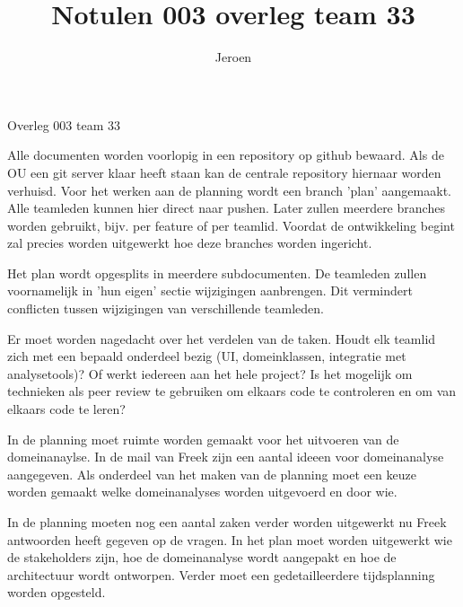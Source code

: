 \documentclass{article}
\title{Notulen 003 overleg team 33}
\author{Jeroen}
\begin{document}

\begin{Minutes}{Overleg 003 team 33}

\maketitle%


Alle documenten worden voorlopig in een repository op github bewaard. Als de OU een git server klaar heeft staan
kan de centrale repository hiernaar worden verhuisd. Voor het werken aan de planning wordt een branch 'plan' aangemaakt.
Alle teamleden kunnen hier direct naar pushen. Later zullen meerdere branches worden gebruikt, bijv. per feature of per
teamlid. Voordat de ontwikkeling begint zal precies worden uitgewerkt hoe deze branches worden ingericht.


Het plan wordt opgesplits in meerdere subdocumenten. De teamleden zullen voornamelijk in 'hun eigen' sectie
wijzigingen aanbrengen. Dit vermindert conflicten tussen wijzigingen van verschillende teamleden.


Er moet worden nagedacht over het verdelen van de taken. Houdt elk teamlid zich met een bepaald onderdeel bezig
(UI, domeinklassen, integratie met analysetools)? Of werkt iedereen aan het hele project? Is het mogelijk om technieken
als peer review te gebruiken om elkaars code te controleren en om van elkaars code te leren?



In de planning moet ruimte worden gemaakt voor het uitvoeren van de domeinanaylse. In de mail van Freek zijn een aantal
ideeen voor domeinanalyse aangegeven. Als onderdeel van het maken van de planning moet een keuze worden gemaakt welke
domeinanalyses worden uitgevoerd en door wie.


In de planning moeten nog een aantal zaken verder worden uitgewerkt nu Freek antwoorden heeft gegeven op de vragen.
In het plan moet worden uitgewerkt wie de stakeholders zijn, hoe de domeinanalyse wordt aangepakt en hoe de architectuur
wordt ontworpen. Verder moet een gedetailleerdere tijdsplanning worden opgesteld.


\end{Minutes}
\end{document}
